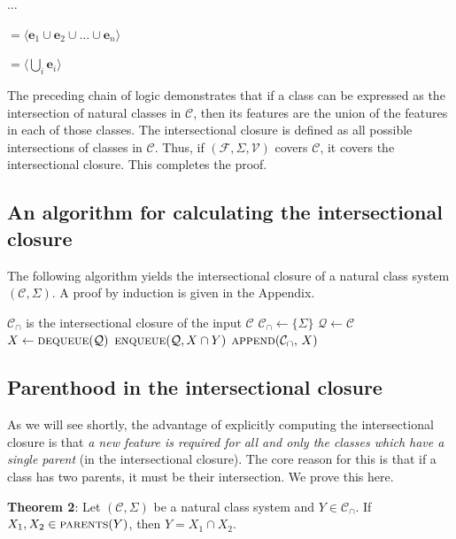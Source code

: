 \documentclass[11pt, oneside]{article}   	%
\begin{document}
\quad $\ldots$

\quad $= \langle \mathbf{e}_1 \cup \mathbf{e}_2 \cup \ldots \cup \mathbf{e}_n \rangle$

\quad $= \langle \bigcup_i  \mathbf{e}_i \rangle$

\noindent The preceding chain of logic demonstrates that if a class can be expressed as the intersection of natural classes in $\mathcal C$, then its features are the union of the features in each of those classes. The intersectional closure is defined as all possible intersections of classes in $\mathcal C$. Thus, if $(\mathcal F, \Sigma, \mathcal V)$ covers $\mathcal C$, it covers the intersectional closure. This completes the proof.

\subsection{An algorithm for calculating the intersectional closure}

The following algorithm yields the intersectional closure of a natural class system $(\mathcal C, \Sigma)$. A proof by induction is given in the Appendix.

\noindent \begin{algorithmic}
    \ENSURE $\mathcal C_\cap$ is the intersectional closure of the input $\mathcal C$
    \STATE
    \STATE $\mathcal C_\cap \leftarrow \{ \Sigma \} $
    \STATE $\mathcal Q \leftarrow \mathcal C$
    \STATE
        \STATE $X \leftarrow \textsc{dequeue}(\mathcal Q)$
                \STATE $\textsc{enqueue}(\mathcal Q, X \cap Y)$
            \ENDFOR
            \STATE $\textsc{append}(\mathcal C_\cap, \, X)$
        \ENDIF
    \ENDWHILE
\end{algorithmic}

\subsection{Parenthood in the intersectional closure}

As we will see shortly, the advantage of explicitly computing the intersectional closure is that \textit{a new feature is required for all and only the classes which have a single parent} (in the intersectional closure). The core reason for this is that if a class has two parents, it must be their intersection. We prove this here.

\vspace{\baselineskip} \noindent \textbf{Theorem 2}: Let $(\mathcal C, \Sigma)$ be a natural class system and $Y \in \mathcal C_\cap$. If $X_1, X_2 \in \textsc{parents}(Y)$, then $Y = X_1 \cap X_2$.
\end{document}
